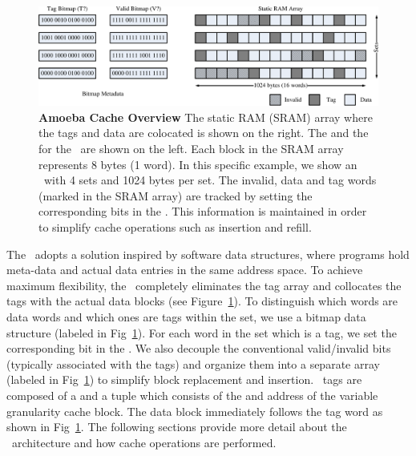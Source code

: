 \begin{figure}[h]
  \begin{center}
    \includegraphics[width=\textwidth]{files/Figures/06-AmoebaCacheArch.pdf}
    \caption[Amoeba Cache Overview]{\textbf{Amoeba Cache Overview} The static RAM (SRAM) array where the tags and data are colocated is shown on the right. The  and the  for the \AC\ are shown on the left. Each block in the SRAM array represents 8 bytes (1 word). In this specific example, we show an \AC\ with 4 sets and 1024 bytes per set. The invalid, data and tag words (marked in the SRAM array) are tracked by setting the corresponding bits in the . This information is maintained in order to simplify cache operations such as insertion and refill. }
    \label{fig:amoeba_cache_arch}
  \end{center}
\end{figure}

The \AC\ adopts a solution inspired by software data structures, where programs hold meta-data and actual data entries in the same address space. To achieve maximum flexibility, the \AC\ completely eliminates the tag array and collocates the tags with the actual data blocks (see Figure~\ref{fig:amoeba_cache_arch}). To distinguish which words are data words and which ones are tags within the set, we use a bitmap data structure (labeled  in Fig~\ref{fig:amoeba_cache_arch}). For each word in the set which is a tag, we set the corresponding bit in the . We also decouple the conventional valid/invalid bits (typically associated with the tags) and organize them into a separate array (labeled  in Fig~\ref{fig:amoeba_cache_arch}) to simplify block replacement and insertion. \AC\ tags are composed of a  and a tuple which consists of the  and  address of the variable granularity cache block. The data block immediately follows the tag word as shown in Fig~\ref{fig:amoeba_cache_arch}. The following sections provide more detail about the \AC\ architecture and how cache operations are performed.


